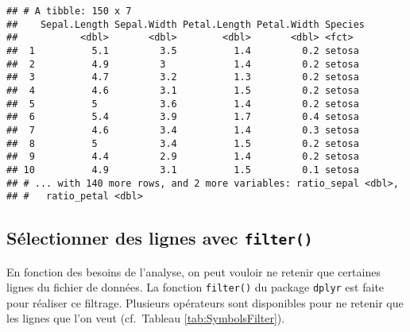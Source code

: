 \documentclass[
  french,
]{book}
\begin{document}
\begin{verbatim}
## # A tibble: 150 x 7
##    Sepal.Length Sepal.Width Petal.Length Petal.Width Species
##           <dbl>       <dbl>        <dbl>       <dbl> <fct>  
##  1          5.1         3.5          1.4         0.2 setosa 
##  2          4.9         3            1.4         0.2 setosa 
##  3          4.7         3.2          1.3         0.2 setosa 
##  4          4.6         3.1          1.5         0.2 setosa 
##  5          5           3.6          1.4         0.2 setosa 
##  6          5.4         3.9          1.7         0.4 setosa 
##  7          4.6         3.4          1.4         0.3 setosa 
##  8          5           3.4          1.5         0.2 setosa 
##  9          4.4         2.9          1.4         0.2 setosa 
## 10          4.9         3.1          1.5         0.1 setosa 
## # ... with 140 more rows, and 2 more variables: ratio_sepal <dbl>,
## #   ratio_petal <dbl>
\end{verbatim}

\hypertarget{suxe9lectionner-des-lignes-avec-filter}{%
\subsection{\texorpdfstring{Sélectionner des lignes avec \texttt{filter()}}{Sélectionner des lignes avec filter()}}\label{suxe9lectionner-des-lignes-avec-filter}}

En fonction des besoins de l'analyse, on peut vouloir ne retenir que certaines lignes du fichier de données. La fonction \texttt{filter()} du package \texttt{dplyr} est faite pour réaliser ce filtrage. Plusieurs opérateurs sont disponibles pour ne retenir que les lignes que l'on veut (cf.~Tableau \ref{tab:SymbolsFilter}).

\providecommand{\docline}[3]{\noalign{\global\setlength{\arrayrulewidth}{#1}}\arrayrulecolor[HTML]{#2}\cline{#3}}

\setlength{\tabcolsep}{2pt}

\renewcommand*{\arraystretch}{1.5}
\end{document}
